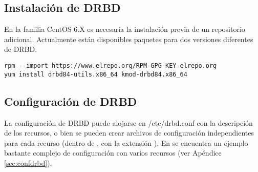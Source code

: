 


% 

\subsection{Instalación de DRBD}
En la familia CentOS 6.X es necesaria la instalación previa de un repositorio adicional. Actualmente están disponibles paquetes para dos versiones diferentes de DRBD. 
\begin{lstlisting}
rpm --import https://www.elrepo.org/RPM-GPG-KEY-elrepo.org
yum install drbd84-utils.x86_64 kmod-drbd84.x86_64
\end{lstlisting} 

\subsection{Configuración de DRBD}

La configuración de DRBD puede alojarse en /etc/drbd.conf con la descripción de los recursos, o bien se pueden crear archivos de configuración independientes para cada recurso (dentro de , con la extensión ). En  se encuentra un ejemplo bastante complejo de configuración con varios recursos (ver Apéndice \ref{sec:confdrbd}). 
\\




